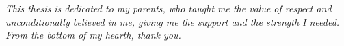 \cleardoublepage
\begin{dedication}
\begin{flushright}
\textit{This thesis is dedicated to my parents, who taught me the value of respect and unconditionally believed in me, giving me the support and the strength I needed. From the bottom of my hearth, thank you.}
\end{flushright}
\end{dedication}